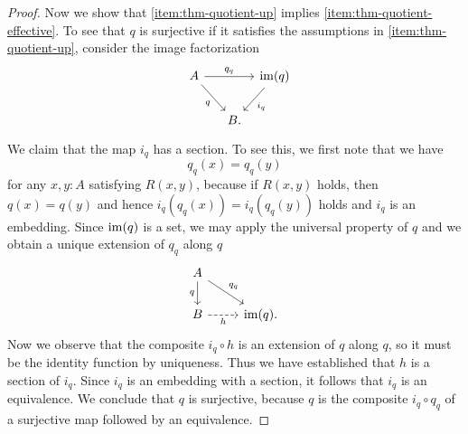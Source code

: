 \begin{proof}
  Now we show that \ref{item:thm-quotient-up} implies \ref{item:thm-quotient-effective}. To see that $q$ is surjective if it satisfies the assumptions in \ref{item:thm-quotient-up}, consider the image factorization
  \begin{equation*}
    \begin{tikzcd}[column sep=tiny]
      A \arrow[dr,swap,"q"] \arrow[rr,"q_q"] & & \im(q) \arrow[dl,"i_q"] \\
      \phantom{\im(q)} & B.
    \end{tikzcd}
  \end{equation*}
  We claim that the map $i_q$ has a section. To see this, we first note that we have
  \begin{equation*}
    q_q(x)=q_q(y)
  \end{equation*}
  for any $x,y:A$ satisfying $R(x,y)$, because if $R(x,y)$ holds, then $q(x)=q(y)$ and hence $i_q(q_q(x))=i_q(q_q(y))$ holds and $i_q$ is an embedding. Since $\operatorname{im}(q)$ is a set, we may apply the universal property of $q$ and we obtain a unique extension of $q_q$ along $q$
  \begin{equation*}
    \begin{tikzcd}
      A \arrow[d,swap,"q"] \arrow[dr,"q_q"] \\
      B \arrow[r,dashed,swap,"h"] & \im(q).
    \end{tikzcd}
  \end{equation*}
  Now we observe that the composite $i_q\circ h$ is an extension of $q$ along $q$, so it must be the identity function by uniqueness. Thus we have established that $h$ is a section of $i_q$. Since $i_q$ is an embedding with a section, it follows that $i_q$ is an equivalence. We conclude that $q$ is surjective, because $q$ is the composite $i_q\circ q_q$ of a surjective map followed by an equivalence.


\end{proof}
